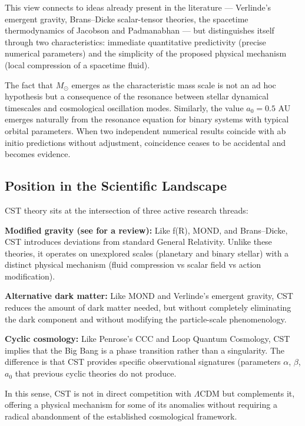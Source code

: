 \documentclass[11pt,a4paper]{article}
\begin{document}
This view connects to ideas already present in the literature ---
Verlinde's emergent gravity, Brans--Dicke scalar-tensor theories, the
spacetime thermodynamics \cite{Jacobson1995,Padmanabhan2010} of Jacobson and Padmanabhan \cite{Padmanabhan2010} --- but
distinguishes itself through two characteristics: immediate quantitative
predictivity (precise numerical parameters) and the simplicity of the
proposed physical mechanism (local compression of a spacetime fluid).

The fact that \(M_\odot\) emerges as the characteristic mass scale is
not an ad hoc hypothesis but a consequence of the resonance between
stellar dynamical timescales and cosmological oscillation modes.
Similarly, the value \(a_0 = 0.5\) AU emerges naturally from the
resonance equation for binary systems with typical orbital parameters.
When two independent numerical results coincide with ab initio
predictions without adjustment, coincidence ceases to be accidental and
becomes evidence.

\hypertarget{position-in-the-scientific-landscape}{%
\subsection{Position in the Scientific
Landscape}\label{position-in-the-scientific-landscape}}

CST theory sits at the intersection of three active research threads:

\textbf{Modified gravity (see \cite{Clifton2012} for a review):} Like f(R), MOND, and Brans--Dicke, CST
introduces deviations from standard General Relativity. Unlike these
theories, it operates on unexplored scales (planetary and binary
stellar) with a distinct physical mechanism (fluid compression vs scalar
field vs action modification).

\textbf{Alternative dark matter:} Like MOND and Verlinde's emergent
gravity, CST reduces the amount of dark matter needed, but without
completely eliminating the dark component and without modifying the
particle-scale phenomenology.

\textbf{Cyclic cosmology:} Like Penrose's CCC \cite{Penrose2010} and Loop Quantum
Cosmology, CST implies that the Big Bang is a phase transition rather
than a singularity. The difference is that CST provides specific
observational signatures (parameters \(\alpha\), \(\beta\), \(a_0\)
that previous cyclic theories do not produce.

In this sense, CST is not in direct competition with \(\Lambda\)CDM but
complements it, offering a physical mechanism for some of its anomalies
without requiring a radical abandonment of the established cosmological
framework.
\end{document}
